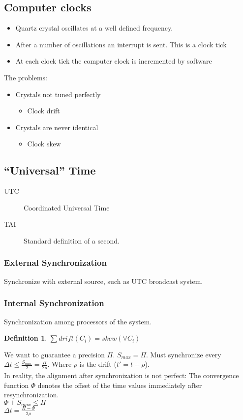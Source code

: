 \documentclass[a4paper]{article}
\newtheorem{definition}{Definition}
\begin{document}
\subsection{Computer clocks}
\begin{itemize}
		\item Quartz crystal oscillates at a well defined frequency.
		\item After a number of oscillations an interrupt is sent. This is a
				clock tick
		\item At each clock tick the computer clock is incremented by software
\end{itemize}
The problems:
\begin{itemize}
		\item Crystals not tuned perfectly
				\begin{itemize}
						\item Clock drift
				\end{itemize}
		\item Crystals are never identical
				\begin{itemize}
						\item Clock skew
				\end{itemize}
\end{itemize}
\subsection{``Universal'' Time}
\begin{description}
		\item[UTC] Coordinated Universal Time
		\item[TAI] Standard definition of a second.
\end{description}

\subsubsection{External Synchronization}
Synchronize with external source, such as UTC broadcast system.
\subsubsection{Internal Synchronization}
Synchronization among processors of the system.
\begin{definition}
		$\sum drift(C_i)=skew(\forall C_i)$
\end{definition}
We want to guarantee a precision $\Pi$. $S_{max}=\Pi$. Must synchronize every $\Delta t \leq
\frac{S_{max}}{2} = \frac{\Pi}{2\rho}$. Where $\rho$ is the drift ($t'=t\pm
\rho$).\\
In reality, the alignment after synchronization is not perfect: The convergence
function $\Phi$ denotes the offset of the time values immediately after
resynchronization.\\
$\Phi+S_{max}\leq \Pi$\\
$\Delta t = \frac{\Pi - \Phi}{2\rho}$
\end{document}
